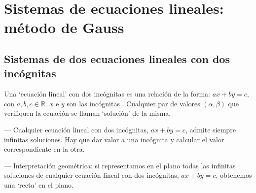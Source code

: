 
\chapter{Sistemas de ecuaciones lineales: método de Gauss}

\section[Sistemas de dos ecuaciones lineales con dos incógnitas]{Sistemas de dos ecuaciones lineales con dos incógnitas}
\begin{defi}
Una `ecuación lineal' con dos incógnitas es una relación de la forma: $ax+by=c$, con $a,b,c \in \mathbb R$. $x$ e $y$ son las incógnitas	.
Cualquier par de valores $(\alpha, \beta)$ que verifiquen la ecuación se llaman `solución' de la misma.
\end{defi}
\vspace{-3mm}
\noindent \small{--- Cualquier ecuación lineal con dos incógnitas, $ax+by=c$, admite siempre infinitas soluciones. Hay que dar valor a una incógnita y calcular el valor correspondiente en la otra.}

\noindent \small{--- Interpretación geométrica: si representamos en el plano todas las infinitas soluciones de cualquier ecuación lineal con dos incógnitas, $ax+by=c$, obtenemos una `recta' en el plano.}

